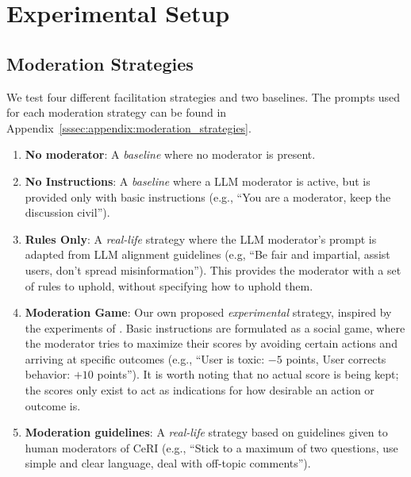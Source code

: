 \section{Experimental Setup}
\label{sec:experimental}

\subsection{Moderation Strategies}
\label{ssec:experimental:strategies}

We test four different facilitation strategies and two baselines. The prompts used for each moderation strategy can be found in Appendix~\ref{sssec:appendix:moderation_strategies}.

\begin{enumerate}[noitemsep]
    \item \textbf{No moderator}: A \emph{baseline} where no moderator is present.

    \item \textbf{No Instructions}: A \emph{baseline} where a \ac{LLM} moderator is active, but is provided only with basic instructions (e.g., “You are a moderator, keep the discussion civil”).

    \item \textbf{Rules Only}: A \emph{real-life} strategy where the \ac{LLM} moderator's prompt is adapted from \ac{LLM} alignment guidelines \cite{collective_constitution} (e.g, “Be fair and impartial, assist users, don't spread misinformation”). This provides the moderator with a set of rules to uphold, without specifying how to uphold them.
    
    \item \textbf{Moderation Game}: Our own proposed \emph{experimental} strategy, inspired by the experiments of \citet{abdelnabi_negotiations}. Basic instructions are formulated as a social game, where the moderator tries to maximize their scores by avoiding certain actions and arriving at specific outcomes (e.g., “User is toxic: $-5$ points, User corrects behavior: $+10$ points”). It is worth noting that no actual score is being kept; the scores only exist to act as indications for how desirable an action or outcome is. 

    \item \textbf{Moderation guidelines}: A \emph{real-life} strategy based on guidelines given to human moderators of \ac{CeRI} \citep{Cornell_eRulemaking2017} (e.g., “Stick to a maximum of two questions, use simple and clear language, deal with off-topic comments”). %


\end{enumerate}
